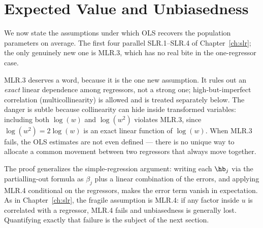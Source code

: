 \section{Expected Value and Unbiasedness}

We now state the assumptions under which OLS recovers the population parameters on average. The first four parallel SLR.1--SLR.4 of Chapter~\ref{ch:slr}; the only genuinely new one is MLR.3, which has no real bite in the one-regressor case.


MLR.3 deserves a word, because it is the one new assumption. It rules out an \emph{exact} linear dependence among regressors, not a strong one; high-but-imperfect correlation (multicollinearity) is allowed and is treated separately below. The danger is subtle because collinearity can hide inside transformed variables: including both $\log(w)$ and $\log(w^2)$ violates MLR.3, since $\log(w^2) = 2\log(w)$ is an exact linear function of $\log(w)$. When MLR.3 fails, the OLS estimates are not even defined --- there is no unique way to allocate a common movement between two regressors that always move together.


The proof generalizes the simple-regression argument: writing each $\hb_j$ via the partialling-out formula as $\beta_j$ plus a linear combination of the errors, and applying MLR.4 conditional on the regressors, makes the error term vanish in expectation. As in Chapter~\ref{ch:slr}, the fragile assumption is MLR.4: if any factor inside $u$ is correlated with a regressor, MLR.4 fails and unbiasedness is generally lost. Quantifying exactly that failure is the subject of the next section.

